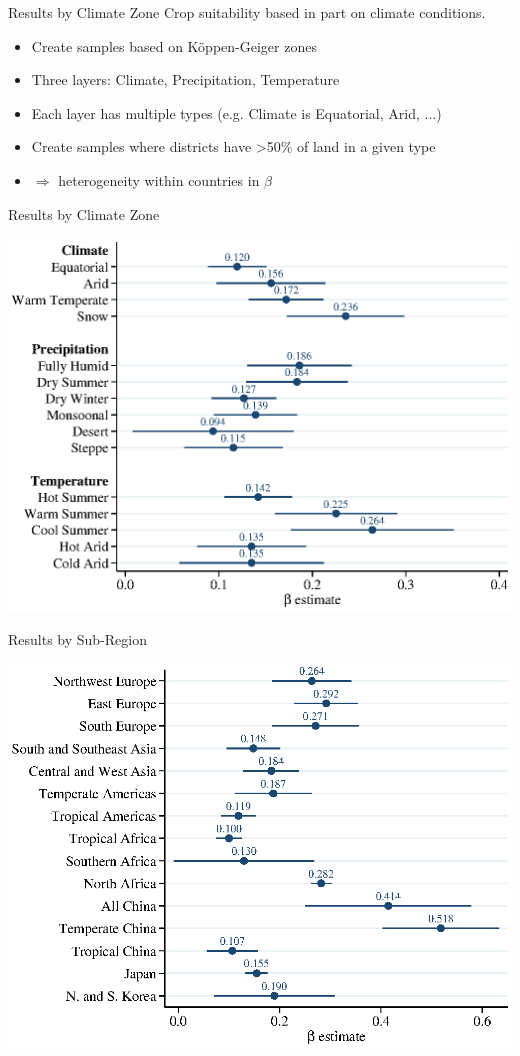 \documentclass[10pt, xcolor=dvipsnames]{beamer}
\begin{document}
\begin{frame}{Results by Climate Zone}
Crop suitability based in part on climate conditions. 
\begin{itemize}
  \item Create samples based on K{\"o}ppen-Geiger zones
  \item Three layers: Climate, Precipitation, Temperature
  \item Each layer has multiple types (e.g. Climate is Equatorial, Arid, ...)
  \item Create samples where districts have >50\% of land in a given type
  \item $\Rightarrow$ heterogeneity within countries in $\beta$  
\end{itemize}
\end{frame}

\begin{frame}{Results by Climate Zone}\label{climate}
\begin{center}
\includegraphics[width=.8\textwidth]{fig_coef_kg_base.eps}
\end{center}
\hfill \hyperlink{climatereg}{}
\end{frame}

\begin{frame}{Results by Sub-Region}\label{subregion}
\begin{center}
\includegraphics[width=.8\textwidth]{fig_coef_subregion_base.eps}
\end{center}
\hfill \hyperlink{subregiontab}{}
\end{frame}
\end{document}
